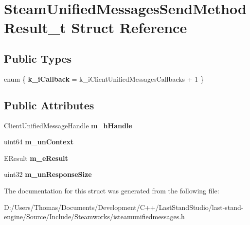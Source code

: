 \hypertarget{structSteamUnifiedMessagesSendMethodResult__t}{}\section{Steam\+Unified\+Messages\+Send\+Method\+Result\+\_\+t Struct Reference}
\label{structSteamUnifiedMessagesSendMethodResult__t}
\subsection*{Public Types}
\begin{DoxyCompactItemize}
\item 
\hypertarget{structSteamUnifiedMessagesSendMethodResult__t_a4c7c44f7550f0a58dd24da666126ca4d}{}enum \{ {\bfseries k\+\_\+i\+Callback} = k\+\_\+i\+Client\+Unified\+Messages\+Callbacks + 1
 \}\label{structSteamUnifiedMessagesSendMethodResult__t_a4c7c44f7550f0a58dd24da666126ca4d}

\end{DoxyCompactItemize}
\subsection*{Public Attributes}
\begin{DoxyCompactItemize}
\item 
\hypertarget{structSteamUnifiedMessagesSendMethodResult__t_ad8db3c4f7487309453ebdc4d16f61a46}{}Client\+Unified\+Message\+Handle {\bfseries m\+\_\+h\+Handle}\label{structSteamUnifiedMessagesSendMethodResult__t_ad8db3c4f7487309453ebdc4d16f61a46}

\item 
\hypertarget{structSteamUnifiedMessagesSendMethodResult__t_a098ff61718969c9438e836aef392657a}{}uint64 {\bfseries m\+\_\+un\+Context}\label{structSteamUnifiedMessagesSendMethodResult__t_a098ff61718969c9438e836aef392657a}

\item 
\hypertarget{structSteamUnifiedMessagesSendMethodResult__t_a2edf40e094c42570509c3c809933d274}{}E\+Result {\bfseries m\+\_\+e\+Result}\label{structSteamUnifiedMessagesSendMethodResult__t_a2edf40e094c42570509c3c809933d274}

\item 
\hypertarget{structSteamUnifiedMessagesSendMethodResult__t_a4628e66007485646b5564c73b3d92619}{}uint32 {\bfseries m\+\_\+un\+Response\+Size}\label{structSteamUnifiedMessagesSendMethodResult__t_a4628e66007485646b5564c73b3d92619}

\end{DoxyCompactItemize}


The documentation for this struct was generated from the following file\+:\begin{DoxyCompactItemize}
\item 
D\+:/\+Users/\+Thomas/\+Documents/\+Development/\+C++/\+Last\+Stand\+Studio/last-\/stand-\/engine/\+Source/\+Include/\+Steamworks/isteamunifiedmessages.\+h\end{DoxyCompactItemize}
